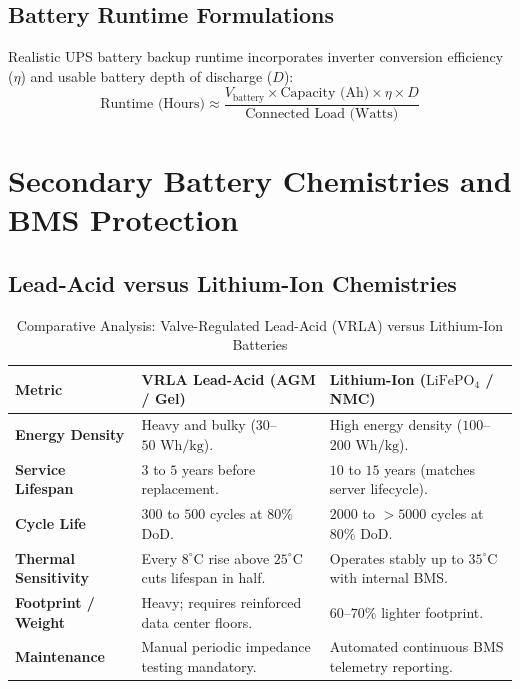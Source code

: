 \subsection{Battery Runtime Formulations}
Realistic UPS battery backup runtime incorporates inverter conversion efficiency ($\eta$) and usable battery depth of discharge ($D$):
\begin{equation}
\label{eq:ups_runtime_formula}
\boxed{\text{Runtime (Hours)} \approx \frac{V_{\text{battery}} \times \text{Capacity (Ah)} \times \eta \times D}{\text{Connected Load (Watts)}}}
\end{equation}


\section{Secondary Battery Chemistries and BMS Protection}
\label{sec:batteries}

\subsection{Lead-Acid versus Lithium-Ion Chemistries}
\begin{table}[htbp]
\centering
\small
\caption{Comparative Analysis: Valve-Regulated Lead-Acid (VRLA) versus Lithium-Ion Batteries}
\label{tab:vrla_vs_liion}
\begin{tabularx}{\textwidth}{l X X}
\toprule
\textbf{Metric} & \textbf{VRLA Lead-Acid (AGM / Gel)} & \textbf{Lithium-Ion ($\text{LiFePO}_4$ / NMC)} \\
\midrule
\textbf{Energy Density} & Heavy and bulky ($30$--$50\text{ Wh/kg}$). & High energy density ($100$--$200\text{ Wh/kg}$). \\
\textbf{Service Lifespan} & $3$ to $5$ years before replacement. & $10$ to $15$ years (matches server lifecycle). \\
\textbf{Cycle Life} & $300$ to $500$ cycles at $80\%$ DoD. & $2000$ to $>5000$ cycles at $80\%$ DoD. \\
\textbf{Thermal Sensitivity} & Every $8^{\circ}\text{C}$ rise above $25^{\circ}\text{C}$ cuts lifespan in half. & Operates stably up to $35^{\circ}\text{C}$ with internal BMS. \\
\textbf{Footprint / Weight} & Heavy; requires reinforced data center floors. & $60$--$70\%$ lighter footprint. \\
\textbf{Maintenance} & Manual periodic impedance testing mandatory. & Automated continuous BMS telemetry reporting. \\
\bottomrule
\end{tabularx}
\end{table}


